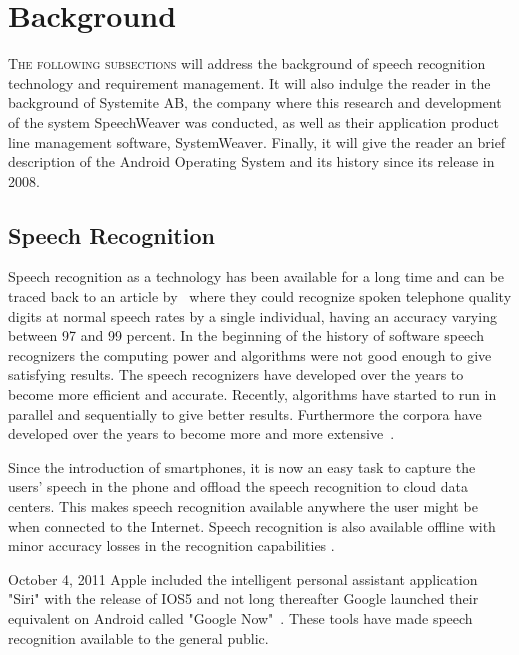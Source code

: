 \chapter{Background}
\lettrine[lines=4, loversize=-0.1, lraise=0.1]{T}{he following subsections} will address the background of speech recognition technology and requirement management. It will also indulge the reader in the background of Systemite AB, the company where this research and development of the system SpeechWeaver was conducted, as well as their application product line management software, SystemWeaver. Finally, it will give the reader an brief description of the Android Operating System and its history since its release in 2008.

\section{Speech Recognition}
Speech recognition as a technology has been available for a long time and can be traced back to an article by~\citet{davis1952} where they could recognize spoken telephone quality digits at normal speech rates by a single individual, having an accuracy varying between 97 and 99 percent. In the beginning of the history of software speech recognizers the computing power and algorithms were not good enough to give satisfying results. The speech recognizers have developed over the years to become more efficient and accurate. Recently, algorithms have started to run in parallel and sequentially to give better results. Furthermore the corpora have developed over the years to become more and more extensive~\citep{BakerJ}.

Since the introduction of smartphones, it is now an easy task to capture the users' speech in the phone and offload the speech recognition to cloud data centers. This makes speech recognition available anywhere the user might be when connected to the Internet. Speech recognition is also available offline with minor accuracy losses in the recognition capabilities \citep{androidIO2012}.

October 4, 2011 Apple included the intelligent personal assistant application "Siri" with the release of IOS5 and not long thereafter Google launched their equivalent on Android called "Google Now"~\citep{sirirelease,googlenowrelease}. These tools have made speech recognition available to the general public.

